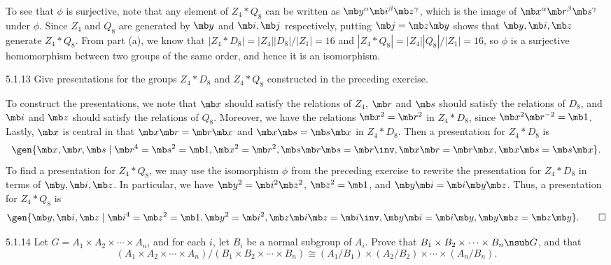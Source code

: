 \begin{solenum}[spsol]
    To see that $\phi$ is surjective, note that any element of $Z_4 \ast Q_8$ can be written as $\mb y^\alpha \mb i^\beta \mb z^\gamma$, which is the image of $\mb x^\alpha \mb r^\beta \mb s^\gamma$ under $\phi$.
    Since $Z_4$ and $Q_8$ are generated by $\mb y$ and $\mb i, \mb j$ respectively, putting $\mb j = \mb z \mb y$ shows that $\mb y, \mb i, \mb z$ generate $Z_4 \ast Q_8$.
    From part (a), we know that $|Z_4 \ast D_8| = |Z_4||D_8|/|Z_1| = 16$ and $|Z_4 \ast Q_8| = |Z_4||Q_8|/|Z_1| = 16$, so $\phi$ is a surjective homomorphism between two groups of the same order, and hence it is an isomorphism.
\end{solenum}

\begin{exercise}{5.1.13}
    Give presentations for the groups $Z_4 \ast D_8$ and $Z_4 \ast Q_8$ constructed in the preceding exercise.
\end{exercise}

\begin{sol}
    To construct the presentations, we note that $\mb x$ should satisfy the relations of $Z_4$, $\mb r$ and $\mb s$ should satisfy the relations of $D_8$, and $\mb i$ and $\mb z$ should satisfy the relations of $Q_8$.
	Moreover, we have the relations $\mb x^2 = \mb r^2$ in $Z_4 \ast D_8$, since $\mb x^2\mb r^{-2} = \mb 1$.
	Lastly, $\mb x$ is central in that $\mb x \mb r = \mb r\mb x$ and $\mb x\mb s = \mb s\mb x$ in $Z_4 \ast D_8$.
	Then a presentation for $Z_4 \ast D_8$ is
    \[
    	\gen{\mb x, \mb r, \mb s \mid \mb r^4 = \mb s^2 = \mb 1, \mb x^2 = \mb r^2, \mb s\mb r\mb s = \mb r\inv, \mb x\mb r = \mb r\mb x, \mb x\mb s = \mb s\mb x}.
    \]
    To find a presentation for $Z_4 \ast Q_8$, we may use the isomorphism $\phi$ from the preceding exercise to rewrite the presentation for $Z_4 \ast D_8$ in terms of $\mb y, \mb i, \mb z$.
	In particular, we have $\mb y^2 = \mb i^2\mb z^2$, $\mb z^2 = \mb 1$, and $\mb y\mb i = \mb i\mb y\mb z$.
	Thus, a presentation for $Z_4 \ast Q_8$ is
    \[
    	\gen{\mb y, \mb i, \mb z \mid \mb i^4 = \mb z^2 = \mb 1, \mb y^2 = \mb i^2, \mb z\mb i \mb z = \mb i\inv, \mb y\mb i = \mb i\mb y, \mb y\mb z = \mb z\mb y}. \qedhere
    \]
\end{sol}

\begin{exercise}{5.1.14}
    Let $G = A_1 \times A_2 \times \cdots \times A_n$, and for each $i$, let $B_i$ be a normal subgroup of $A_i$.
	Prove that $B_1 \times B_2 \times \cdots \times B_n \nsub G$, and that
    \[
    	(A_1 \times A_2 \times \cdots \times A_n)/(B_1 \times B_2 \times \cdots \times B_n) \cong (A_1/B_1) \times (A_2/B_2) \times \cdots \times (A_n/B_n).
    \]
\end{exercise}

